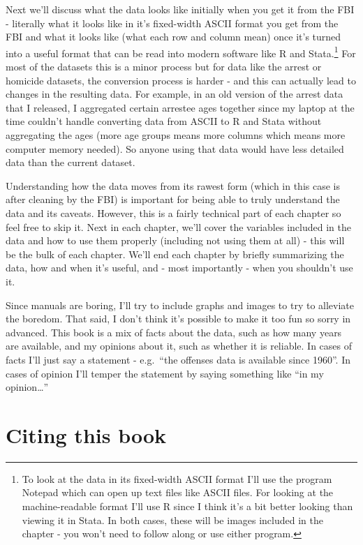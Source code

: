 \documentclass[
  12pt,
  openany]{book}
\begin{document}
Next we'll discuss what the data looks like initially when you get it from the FBI - literally what it looks like in it's fixed-width ASCII format you get from the FBI and what it looks like (what each row and column mean) once it's turned into a useful format that can be read into modern software like R and Stata.\footnote{To look at the data in its fixed-width ASCII format I'll use the program Notepad which can open up text files like ASCII files. For looking at the machine-readable format I'll use R since I think it's a bit better looking than viewing it in Stata. In both cases, these will be images included in the chapter - you won't need to follow along or use either program.} For most of the datasets this is a minor process but for data like the arrest or homicide datasets, the conversion process is harder - and this can actually lead to changes in the resulting data. For example, in an old version of the arrest data that I released, I aggregated certain arrestee ages together since my laptop at the time couldn't handle converting data from ASCII to R and Stata without aggregating the ages (more age groups means more columns which means more computer memory needed). So anyone using that data would have less detailed data than the current dataset.

Understanding how the data moves from its rawest form (which in this case is after cleaning by the FBI) is important for being able to truly understand the data and its caveats. However, this is a fairly technical part of each chapter so feel free to skip it. Next in each chapter, we'll cover the variables included in the data and how to use them properly (including not using them at all) - this will be the bulk of each chapter. We'll end each chapter by briefly summarizing the data, how and when it's useful, and - most importantly - when you shouldn't use it.

Since manuals are boring, I'll try to include graphs and images to try to alleviate the boredom. That said, I don't think it's possible to make it too fun so sorry in advanced. This book is a mix of facts about the data, such as how many years are available, and my opinions about it, such as whether it is reliable. In cases of facts I'll just say a statement - e.g.~``the offenses data is available since 1960''. In cases of opinion I'll temper the statement by saying something like ``in my opinion\ldots{}''

\hypertarget{citing-this-book}{%
\section*{Citing this book}\label{citing-this-book}}
\end{document}
